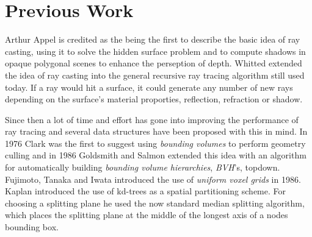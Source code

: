 




\chapter{Previous Work}



Arthur Appel is credited as the being the first to describe the basic
idea of ray casting, using it to solve the hidden
surface problem and to compute shadows in opaque polygonal scenes to
enhance the perseption of depth. Whitted extended the idea of ray
casting into the general recursive ray tracing algorithm still used
today. If a ray would hit a surface, it could
generate any number of new rays depending on the surface's material
proporties, reflection, refraction or shadow.



Since then a lot of time and effort has gone into improving the
performance of ray tracing and several data structures have been
proposed with this in mind. In 1976 Clark was the first to suggest
using \textit{bounding volumes} to perform geometry culling and in
1986 Goldsmith and Salmon extended this idea with an algorithm for
automatically building \textit{bounding volume hierarchies},
\textit{BVH}'s, topdown. Fujimoto, Tanaka and
Iwata introduced the use of \textit{uniform voxel grids} in
1986. Kaplan introduced the use of kd-trees as
a spatial partitioning scheme. For choosing a
splitting plane he used the now standard median splitting algorithm,
which places the splitting plane at the middle of the longest axis of
a nodes bounding box.


